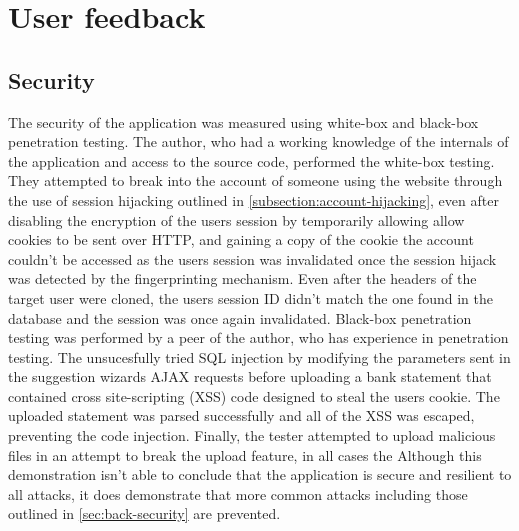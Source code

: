 


\section{User feedback}




\subsection{Security}
The security of the application was measured using white-box and black-box penetration testing.
%
The author, who had a working knowledge of the internals of the application and access to the source code, performed the white-box testing. They attempted to break into the account of someone using the website through the use of session hijacking outlined in \autoref{subsection:account-hijacking}, even after disabling the encryption of the users session by temporarily allowing allow cookies to be sent over HTTP, and gaining a copy of the cookie the account couldn't be accessed as the users session was invalidated once the session hijack was detected by the fingerprinting mechanism. Even after the headers of the target user were cloned, the users session ID didn't match the one found in the database and the session was once again invalidated.
%
Black-box penetration testing was performed by a peer of the author, who has experience in penetration testing. The unsucesfully tried SQL injection by modifying the parameters sent in the suggestion wizards AJAX requests before uploading a bank statement that contained cross site-scripting (XSS) code designed to steal the users cookie. The uploaded statement was parsed successfully and all of the XSS was escaped, preventing the code injection. Finally, the tester attempted to upload malicious files in an attempt to break the upload feature, in all cases the 
%
Although this demonstration isn't able to conclude that the application is secure and resilient to all attacks, it does demonstrate that more common attacks including those outlined in \autoref{sec:back-security} are prevented.
